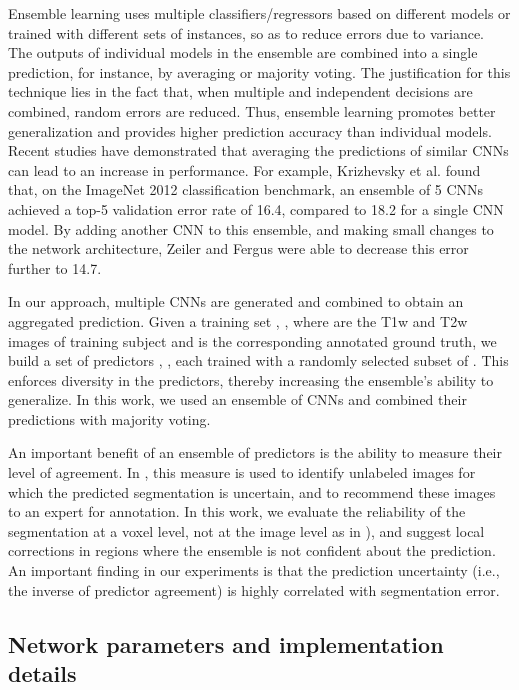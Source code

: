 \documentclass[twoside,espcrc2]{elsarticle}
\begin{document}
Ensemble learning uses multiple classifiers/regressors based on different models or trained with different sets of instances, so as to reduce errors due to variance. The outputs of individual models in the ensemble are combined into a single prediction, for instance, by averaging or majority voting. The justification for this technique lies in the fact that, when multiple and independent decisions are combined, random errors are reduced. 
Thus, ensemble learning promotes better generalization and provides higher prediction accuracy than individual models. Recent studies have demonstrated that averaging the predictions of similar CNNs can lead to an increase in performance. For example, Krizhevsky et al. \cite{krizhevsky2012imagenet} found that, on the ImageNet 2012 classification benchmark, an ensemble of 5 CNNs achieved a top-5 validation error rate of 16.4, compared to 18.2 for a single CNN model. By adding another CNN to this ensemble, and making small changes to the network architecture, Zeiler and Fergus \cite{zeiler2014visualizing} were able to decrease this error further to 14.7.

In our approach, multiple CNNs are generated and combined to obtain an aggregated prediction. Given a training set , , where  are the T1w and T2w images of training subject  and  is the corresponding annotated ground truth, we build a set of predictors , , each trained with a randomly selected subset of . This enforces diversity in the predictors, thereby increasing the ensemble's ability to generalize. In this work, we used an ensemble of  CNNs and combined their predictions with majority voting. 


An important benefit of an ensemble of predictors is the ability to measure their level of agreement. In \cite{yang2017suggestive}, this measure is used to identify unlabeled images for which the predicted segmentation is uncertain, and to recommend these images to an expert for annotation. In this work, we evaluate the reliability of the segmentation at a voxel level, not at the image level as in \cite{yang2017suggestive}), and suggest local corrections in regions where the ensemble is not confident about the prediction. An important finding in our experiments is that the prediction uncertainty (i.e., the inverse of predictor agreement) is highly correlated with segmentation error.
 
\subsection{Network parameters and implementation details} 
\end{document}
